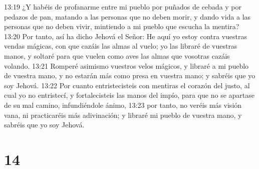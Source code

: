 13:19 ¿Y habéis de profanarme entre mi pueblo por puñados de cebada y por pedazos de pan, matando a las personas que no deben morir, y dando vida a las personas que no deben vivir, mintiendo a mi pueblo que escucha la mentira?  
13:20 Por tanto, así ha dicho Jehová el Señor: He aquí yo estoy contra vuestras vendas mágicas, con que cazáis las almas al vuelo; yo las libraré de vuestras manos, y soltaré para que vuelen como aves las almas que vosotras cazáis volando.  
13:21 Romperé asimismo vuestros velos mágicos, y libraré a mi pueblo de vuestra mano, y no estarán más como presa en vuestra mano; y sabréis que yo soy Jehová.  
13:22 Por cuanto entristecisteis con mentiras el corazón del justo, al cual yo no entristecí, y fortalecisteis las manos del impío, para que no se apartase de su mal camino, infundiéndole ánimo,  
13:23 por tanto, no veréis más visión vana, ni practicaréis más adivinación; y libraré mi pueblo de vuestra mano, y sabréis que yo soy Jehová.  

\chapter{14}

